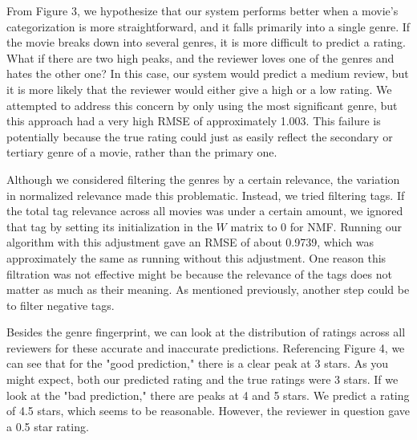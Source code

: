 \documentclass[letterpaper, 10 pt, conference]{ieeeconf}  %
\begin{document}
From Figure 3, we hypothesize that our system performs better when a movie's categorization is more straightforward, and it falls primarily into a single genre. If the movie breaks down into several genres, it is more difficult to predict a rating. What if there are two high peaks, and the reviewer loves one of the genres and hates the other one? In this case, our system would predict a medium review, but it is more likely that the reviewer would either give a high or a low rating. We attempted to address this concern by only using the most significant genre, but this approach had a very high RMSE of approximately 1.003. This failure is potentially because the true rating could just as easily reflect the secondary or tertiary genre of a movie, rather than the primary one.

Although we considered filtering the genres by a certain relevance, the variation in normalized relevance made this problematic. Instead, we tried filtering tags. If the total tag relevance across all movies was under a certain amount, we ignored that tag by setting its initialization in the $W$ matrix to 0 for NMF. Running our algorithm with this adjustment gave an RMSE of about 0.9739, which was approximately the same as running without this adjustment. One reason this filtration was not effective might be because the relevance of the tags does not matter as much as their meaning. As mentioned previously, another step could be to filter negative tags.

Besides the genre fingerprint, we can look at the distribution of ratings across all reviewers for these accurate and inaccurate predictions. Referencing Figure 4, we can see that for the "good prediction," there is a clear peak at 3 stars. As you might expect, both our predicted rating and the true ratings were 3 stars. If we look at the "bad prediction," there are peaks at 4 and 5 stars. We predict a rating of 4.5 stars, which seems to be reasonable. However, the reviewer in question gave a 0.5 star rating.
\end{document}

